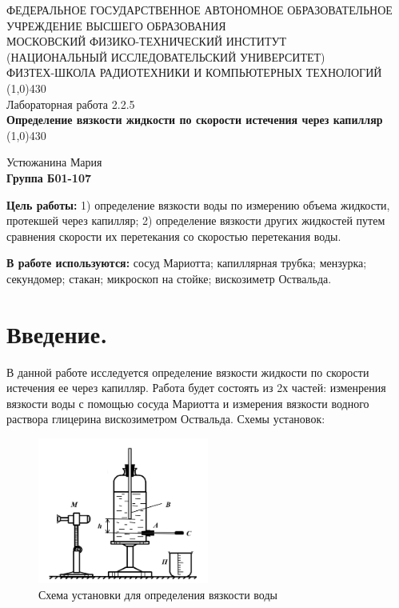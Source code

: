 \documentclass[11pt]{article}
\begin{document}
\begin{titlepage}
\begin{center}
\large{\small ФЕДЕРАЛЬНОЕ ГОСУДАРСТВЕННОЕ АВТОНОМНОЕ ОБРАЗОВАТЕЛЬНОЕ\\ УЧРЕЖДЕНИЕ ВЫСШЕГО ОБРАЗОВАНИЯ\\ МОСКОВСКИЙ ФИЗИКО-ТЕХНИЧЕСКИЙ ИНСТИТУТ\\ (НАЦИОНАЛЬНЫЙ ИССЛЕДОВАТЕЛЬСКИЙ УНИВЕРСИТЕТ)\\ ФИЗТЕХ-ШКОЛА РАДИОТЕХНИКИ И КОМПЬЮТЕРНЫХ ТЕХНОЛОГИЙ}
\vfill
\line(1,0){430}\\[1mm]
\huge{Лабораторная работа 2.2.5}\\
\huge\textbf{Определение вязкости жидкости по скорости истечения через капилляр}\\
\line(1,0){430}\\[1mm]
\vfill
\begin{flushright}
\normalsize{Устюжанина Мария}\\
\normalsize{\textbf{Группа Б01-107}}\\
\end{flushright}
\end{center}
\end{titlepage}


\par \textbf{Цель работы:} 1) определение вязкости воды по измерению объема жидкости, протекшей через капилляр; 2) определение вязкости других жидкостей путем сравнения скорости их перетекания со скоростью перетекания воды.
\par \textbf{В работе используются:} сосуд Мариотта; капиллярная трубка; мензурка; секундомер; стакан; микроскоп на стойке; вискозиметр Оствальда.

\section{Введение.}

В данной работе исследуется определение вязкости жидкости по скорости истечения ее через капилляр. Работа будет состоять из 2х частей: изменрения вязкости воды с помощью сосуда Мариотта и измерения вязкости водного раствора глицерина вискозиметром Оствальда. Схемы установок:

\begin{figure}[H]
\centering
\captionsetup{justification=centering}
\includegraphics[width=0.5\textwidth]{Pic1.png}
\caption{Схема установки для определения вязкости воды}
\end{figure}
\end{document}
